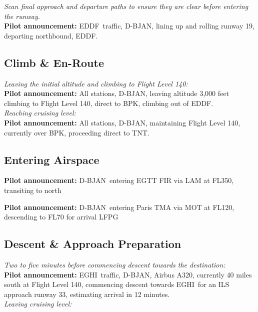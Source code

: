 \documentclass{article}
\newcommand{\callsign}{D-BJAN}
\newcommand{\departure}{EDDF}
\newcommand{\destination}{EGHI}
\begin{document}
\textit{Scan final approach and departure paths to ensure they are clear before entering the runway.} \\

\textbf{Pilot announcement:} \departure~traffic, \callsign, lining up and rolling runway 19, departing northbound, \departure.

\subsection*{Climb \& En-Route}

\textit{Leaving the initial altitude and climbing to Flight Level 140:} \\

\textbf{Pilot announcement:} All stations, \callsign, leaving altitude 3,000 feet climbing to Flight Level 140, direct to BPK, climbing out of \departure. \\

\textit{Reaching cruising level:} \\

\textbf{Pilot announcement:} All stations, \callsign, maintaining Flight Level 140, currently over BPK, proceeding direct to TNT.

\subsection*{Entering Airspace}

\textbf{Pilot announcement:} \callsign~entering EGTT FIR via LAM at FL350, transiting to north

\textbf{Pilot announcement:} \callsign~entering Paris TMA via MOT at FL120, descending to FL70 for arrival LFPG

\subsection*{Descent \& Approach Preparation}

\textit{Two to five minutes before commencing descent towards the destination:} \\

\textbf{Pilot announcement:} \destination~traffic, \callsign, Airbus A320, currently 40 miles south at Flight Level 140, commencing descent towards \destination~for an ILS approach runway 33, estimating arrival in 12 minutes. \\

\textit{Leaving cruising level:} \\
\end{document}
